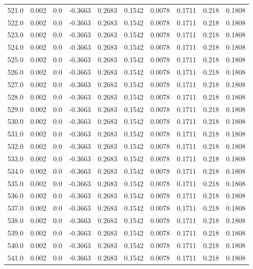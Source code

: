 \begin{longtable}{lrrrrrrrrr}
521.0 & 0.002 & 0.0 & -0.3663 & 0.2683 & 0.1542 & 0.0078 & 0.1711 & 0.218 & 0.1808 \\
522.0 & 0.002 & 0.0 & -0.3663 & 0.2683 & 0.1542 & 0.0078 & 0.1711 & 0.218 & 0.1808 \\
523.0 & 0.002 & 0.0 & -0.3663 & 0.2683 & 0.1542 & 0.0078 & 0.1711 & 0.218 & 0.1808 \\
524.0 & 0.002 & 0.0 & -0.3663 & 0.2683 & 0.1542 & 0.0078 & 0.1711 & 0.218 & 0.1808 \\
525.0 & 0.002 & 0.0 & -0.3663 & 0.2683 & 0.1542 & 0.0078 & 0.1711 & 0.218 & 0.1808 \\
526.0 & 0.002 & 0.0 & -0.3663 & 0.2683 & 0.1542 & 0.0078 & 0.1711 & 0.218 & 0.1808 \\
527.0 & 0.002 & 0.0 & -0.3663 & 0.2683 & 0.1542 & 0.0078 & 0.1711 & 0.218 & 0.1808 \\
528.0 & 0.002 & 0.0 & -0.3663 & 0.2683 & 0.1542 & 0.0078 & 0.1711 & 0.218 & 0.1808 \\
529.0 & 0.002 & 0.0 & -0.3663 & 0.2683 & 0.1542 & 0.0078 & 0.1711 & 0.218 & 0.1808 \\
530.0 & 0.002 & 0.0 & -0.3663 & 0.2683 & 0.1542 & 0.0078 & 0.1711 & 0.218 & 0.1808 \\
531.0 & 0.002 & 0.0 & -0.3663 & 0.2683 & 0.1542 & 0.0078 & 0.1711 & 0.218 & 0.1808 \\
532.0 & 0.002 & 0.0 & -0.3663 & 0.2683 & 0.1542 & 0.0078 & 0.1711 & 0.218 & 0.1808 \\
533.0 & 0.002 & 0.0 & -0.3663 & 0.2683 & 0.1542 & 0.0078 & 0.1711 & 0.218 & 0.1808 \\
534.0 & 0.002 & 0.0 & -0.3663 & 0.2683 & 0.1542 & 0.0078 & 0.1711 & 0.218 & 0.1808 \\
535.0 & 0.002 & 0.0 & -0.3663 & 0.2683 & 0.1542 & 0.0078 & 0.1711 & 0.218 & 0.1808 \\
536.0 & 0.002 & 0.0 & -0.3663 & 0.2683 & 0.1542 & 0.0078 & 0.1711 & 0.218 & 0.1808 \\
537.0 & 0.002 & 0.0 & -0.3663 & 0.2683 & 0.1542 & 0.0078 & 0.1711 & 0.218 & 0.1808 \\
538.0 & 0.002 & 0.0 & -0.3663 & 0.2683 & 0.1542 & 0.0078 & 0.1711 & 0.218 & 0.1808 \\
539.0 & 0.002 & 0.0 & -0.3663 & 0.2683 & 0.1542 & 0.0078 & 0.1711 & 0.218 & 0.1808 \\
540.0 & 0.002 & 0.0 & -0.3663 & 0.2683 & 0.1542 & 0.0078 & 0.1711 & 0.218 & 0.1808 \\
541.0 & 0.002 & 0.0 & -0.3663 & 0.2683 & 0.1542 & 0.0078 & 0.1711 & 0.218 & 0.1808 \\

\end{longtable}
